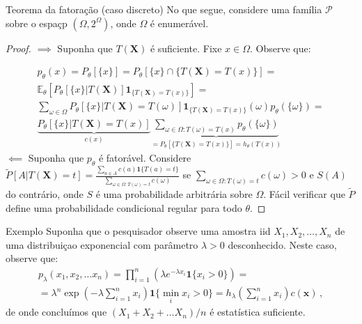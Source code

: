 \documentclass[11pt]{beamer}
\begin{document}
	\begin{frame}{Teorema da fatoração (caso discreto)}
		No que segue, considere uma família $\mathcal{P}$ sobre o espaçp $(\Omega, 2^\Omega)$, onde $\Omega$ é enumerável.
		\begin{proof}
			\footnotesize
			$\implies$ Suponha que $T(\boldsymbol{X})$ é suficiente. Fixe $x \in \Omega$. Observe que:
			
			\begin{align*}
			p_{\theta}(x) = P_\theta[\{ x\}] =  P_\theta[\{x\} \cap \{T(\boldsymbol{X})= T(x)\}] =\\
			  \mathbb{E}_\theta[P_\theta[\{x\}|T(\boldsymbol{X})] \mathbf{1}_{\{T(\boldsymbol{X}) = T(x)\}}] =\\ \sum_{\omega \in \Omega}  P_\theta[\{x\}|T(\boldsymbol{X}) = T(\omega)] \mathbf{1}_{\{T(\boldsymbol{X}) = T(x)\}}(\omega) p_\theta(\{\omega\}) = \\
			  	 \underbrace{P_\theta[\{x\}|T(\boldsymbol{X})=T(x)]}_{c(x)} \underbrace{\sum_{\omega \in \Omega: T(\omega)= T(x)} p_\theta(\{\omega\})}_{=P_\theta[\{T(\boldsymbol{X}) = T(x)\}] = h_{\theta}(T(x))}
			\end{align*}
			$\impliedby$ Suponha que $p_\theta$ é fatorável. Considere $\tilde{P}[A|T(\boldsymbol{X}) = t] = \frac{\sum_{a\in A}c(a) \mathbf{1}\{T(a) = t\}}{\sum_{\omega \in \Omega : T(\omega) = t} c(\omega)}$ se $\sum_{\omega \in \Omega : T(\omega) = t} c(\omega)>0$ e $S(A)$ do contrário, onde $S$ é uma probabilidade arbitrária sobre $\Omega$. Fácil verificar que $\tilde{P}$ define uma probabilidade condicional regular para todo $\theta$.
		\end{proof}
		
		
		

\end{frame}
	
	\begin{frame}{Exemplo}
		Suponha que o pesquisador observe uma amostra iid $X_1,X_2, \ldots, X_n$ de uma distribuiçao exponencial com parâmetro $\lambda > 0$ desconhecido.  Neste caso, observe que:
		\begin{equation*}
			\begin{aligned}
				p_\lambda(x_1,x_2,\ldots x_n) = \prod_{i=1}^n (\lambda e^{-\lambda x_i} \mathbf{1}\{x_i>0\}) =\\ =  \lambda^n \exp\left(- \lambda \sum_{i=1}^n x_i\right)\mathbf{1}\{\min_i x_i > 0 \} = h_\lambda \left(\sum_{i=1}^n x_i\right) c(\boldsymbol{x}) \, ,
			\end{aligned}
		\end{equation*}
		de onde concluímos que $(X_1+X_2 + \ldots X_n)/n$ é estatística suficiente.
		
	\end{frame}
	
\end{document}
